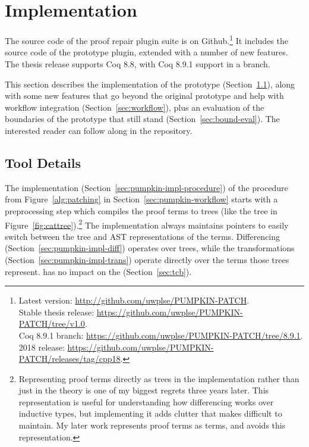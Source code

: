 \section{Implementation}
\label{sec:pumpkin-impl}


The source code of the  proof repair plugin suite is on Github.\footnote{Latest version: \url{http://github.com/uwplse/PUMPKIN-PATCH}.\\ Stable thesis release: \url{https://github.com/uwplse/PUMPKIN-PATCH/tree/v1.0}.\\ Coq 8.9.1 branch: \url{https://github.com/uwplse/PUMPKIN-PATCH/tree/8.9.1}.\\ 2018 release: \url{https://github.com/uwplse/PUMPKIN-PATCH/releases/tag/cpp18}.}
It includes the source code of the  prototype plugin, extended with a number of new features.
The thesis release supports Coq 8.8, with Coq 8.9.1 support in a branch.

This section describes the implementation of the \sysname prototype (Section~\ref{sec:tool}),
along with some new features that go beyond the original prototype and help with workflow integration (Section~\ref{sec:workflow}),
plus an evaluation of the boundaries of the \sysname prototype that still stand (Section~\ref{sec:bound-eval}).
The interested reader can follow along in the repository.


\subsection{Tool Details}
\label{sec:tool}


The implementation (Section~\ref{sec:pumpkin-impl-procedure}) of the procedure from Figure~\ref{alg:patching} in Section~\ref{sec:pumpkin-workflow}
starts with a preprocessing step which compiles the proof terms to 
trees (like the tree in Figure~\ref{fig:cattree}).\footnote{Representing proof terms directly as trees in the implementation rather
than just in the theory is one of my biggest regrets three years later.
This representation is useful for understanding how differencing works over inductive types, but implementing it adds clutter that makes \sysname difficult to maintain.
My later work represents proof terms as terms, and avoids this representation.}
The implementation always maintains pointers to easily switch between the tree and AST representations of the terms.
Differencing (Section~\ref{sec:pumpkin-impl-diff}) operates over trees, 
while the transformations (Section~\ref{sec:pumpkin-impl-trans}) operate directly over the terms those trees represent.
\sysname has no impact on the  (Section~\ref{sec:tcb}).

